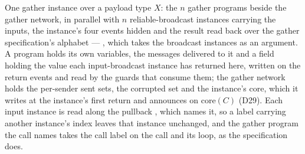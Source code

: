 \begin{definition}
  \label{def:aba-gather-composition}
  \leanok
  One gather instance over a payload type $X$: the $n$ gather programs beside the gather network, in parallel with $n$ reliable-broadcast instances carrying the inputs, the instance's four events hidden and the result read back over the gather specification's alphabet --- , which takes the broadcast instances as an argument.
  A program holds its own variables, the messages delivered to it and a field holding the value each input-broadcast instance has returned here, written on the return events and read by the guards that consume them; the gather network holds the per-sender sent sets, the corrupted set and the instance's core, which it writes at the instance's first return and announces on $\mathrm{core}(C)$ (D29).
  Each input instance is read along the pullback , which names it, so a label carrying another instance's index leaves that instance unchanged, and the gather program the call names takes the call label on the call and its loop, as the specification does.
\end{definition}
